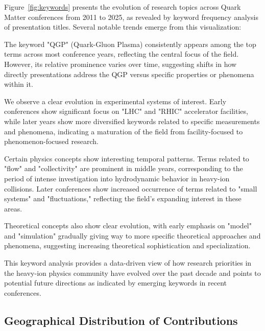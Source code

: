 \documentclass[a4paper,11pt]{article}
\begin{document}
Figure~\ref{fig:keywords} presents the evolution of research topics across Quark Matter conferences from 2011 to 2025, as revealed by keyword frequency analysis of presentation titles. Several notable trends emerge from this visualization:

The keyword "QGP" (Quark-Gluon Plasma) consistently appears among the top terms across most conference years, reflecting the central focus of the field. However, its relative prominence varies over time, suggesting shifts in how directly presentations address the QGP versus specific properties or phenomena within it.

We observe a clear evolution in experimental systems of interest. Early conferences show significant focus on "LHC" and "RHIC" accelerator facilities, while later years show more diversified keywords related to specific measurements and phenomena, indicating a maturation of the field from facility-focused to phenomenon-focused research.

Certain physics concepts show interesting temporal patterns. Terms related to "flow" and "collectivity" are prominent in middle years, corresponding to the period of intense investigation into hydrodynamic behavior in heavy-ion collisions. Later conferences show increased occurrence of terms related to "small systems" and "fluctuations," reflecting the field's expanding interest in these areas.

Theoretical concepts also show clear evolution, with early emphasis on "model" and "simulation" gradually giving way to more specific theoretical approaches and phenomena, suggesting increasing theoretical sophistication and specialization.

This keyword analysis provides a data-driven view of how research priorities in the heavy-ion physics community have evolved over the past decade and points to potential future directions as indicated by emerging keywords in recent conferences.

\subsection{Geographical Distribution of Contributions}
\end{document}
